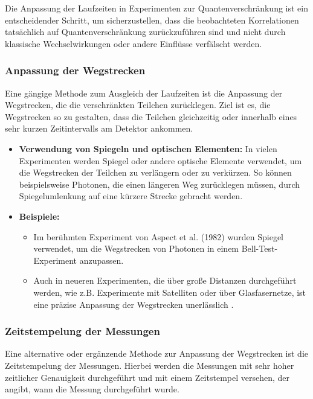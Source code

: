 \documentclass{article}
\begin{document}
	Die Anpassung der Laufzeiten in Experimenten zur Quantenverschränkung ist ein entscheidender Schritt, um sicherzustellen, dass die beobachteten Korrelationen tatsächlich auf Quantenverschränkung zurückzuführen sind und nicht durch klassische Wechselwirkungen oder andere Einflüsse verfälscht werden.
	
	\subsubsection{Anpassung der Wegstrecken}
	
	Eine gängige Methode zum Ausgleich der Laufzeiten ist die Anpassung der Wegstrecken, die die verschränkten Teilchen zurücklegen. Ziel ist es, die Wegstrecken so zu gestalten, dass die Teilchen gleichzeitig oder innerhalb eines sehr kurzen Zeitintervalls am Detektor ankommen.
	
	\begin{itemize}
		\item \textbf{Verwendung von Spiegeln und optischen Elementen:} In vielen Experimenten werden Spiegel oder andere optische Elemente verwendet, um die Wegstrecken der Teilchen zu verlängern oder zu verkürzen. So können beispielsweise Photonen, die einen längeren Weg zurücklegen müssen, durch Spiegelumlenkung auf eine kürzere Strecke gebracht werden.
		\item \textbf{Beispiele:}
		\begin{itemize}
			\item Im berühmten Experiment von Aspect et al. (1982) \cite{aspect1982} wurden Spiegel verwendet, um die Wegstrecken von Photonen in einem Bell-Test-Experiment anzupassen.
			\item Auch in neueren Experimenten, die über große Distanzen durchgeführt werden, wie z.B. Experimente mit Satelliten oder über Glasfasernetze, ist eine präzise Anpassung der Wegstrecken unerlässlich \cite{yin2017}.
		\end{itemize}
	\end{itemize}
	
	\subsubsection{Zeitstempelung der Messungen}
	
	Eine alternative oder ergänzende Methode zur Anpassung der Wegstrecken ist die Zeitstempelung der Messungen. Hierbei werden die Messungen mit sehr hoher zeitlicher Genauigkeit durchgeführt und mit einem Zeitstempel versehen, der angibt, wann die Messung durchgeführt wurde.
	
\end{document}
